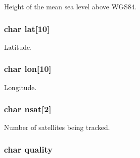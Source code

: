 Height of the mean sea level above W\+G\+S84. 

\hypertarget{struct_g_p_s___d_a_t_a___type_def_ad150f6119d4692545e6250c4dd4d2787}{}
\subsubsection[{lat}]{\setlength{\rightskip}{0pt plus 5cm}char lat\mbox{[}10\mbox{]}}\label{struct_g_p_s___d_a_t_a___type_def_ad150f6119d4692545e6250c4dd4d2787}


Latitude. 

\hypertarget{struct_g_p_s___d_a_t_a___type_def_ad543e94eefa9567d8fda0dfc5f86b751}{}
\subsubsection[{lon}]{\setlength{\rightskip}{0pt plus 5cm}char lon\mbox{[}10\mbox{]}}\label{struct_g_p_s___d_a_t_a___type_def_ad543e94eefa9567d8fda0dfc5f86b751}


Longitude. 

\hypertarget{struct_g_p_s___d_a_t_a___type_def_a08c6ad522733495f34228963dae478d8}{}
\subsubsection[{nsat}]{\setlength{\rightskip}{0pt plus 5cm}char nsat\mbox{[}2\mbox{]}}\label{struct_g_p_s___d_a_t_a___type_def_a08c6ad522733495f34228963dae478d8}


Number of satellites being tracked. 

\hypertarget{struct_g_p_s___d_a_t_a___type_def_aea980c6e93a4a64525288098e722052b}{}
\subsubsection[{quality}]{\setlength{\rightskip}{0pt plus 5cm}char quality}\label{struct_g_p_s___d_a_t_a___type_def_aea980c6e93a4a64525288098e722052b}


